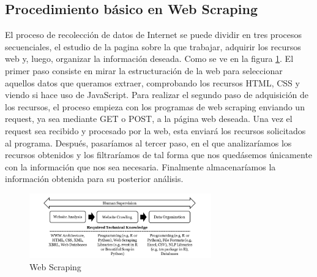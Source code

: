 \subsection{Procedimiento básico en Web Scraping}
El proceso de recolección de datos de Internet se puede dividir en tres procesos secuenciales, el estudio de la pagina sobre la que trabajar, adquirir los recursos web y, luego, organizar la información deseada. Como se ve en la figura \ref{fig:ej2}.
\newline
\newline
El primer paso consiste en mirar la estructuración de la web para seleccionar aquellos datos que queramos extraer, comprobando los recursos HTML, CSS y viendo si hace uso de JavaScript. Para realizar el segundo paso de adquisición de los recursos, el proceso empieza con los programas de web scraping enviando un request, ya sea mediante GET o POST, a la página web deseada. Una vez el request sea recibido y procesado por la web, esta enviará los recursos solicitados al programa. Después, pasaríamos al tercer paso, en el que analizaríamos los recursos obtenidos y los filtraríamos de tal forma que nos quedásemos únicamente con la información que nos sea necesaria. Finalmente almacenaríamos la información obtenida para su posterior análisis.
\newline
\begin{figure} [h!]
	\centering
	\includegraphics[width=0.7\textwidth]{fig/Web-Scraping-Adapted-from-Krotov-and-Tennyson-2018.png}
	\caption[Web Scraping (Krotov y Tennyson 2018)]{Web Scraping \footnotemark}
	\label{fig:ej2}
\end{figure}


